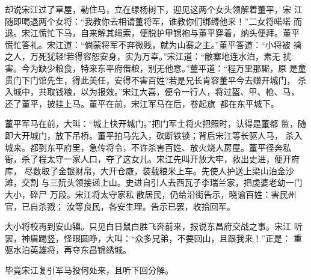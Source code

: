 却说宋江过了草屋，勒住马，立在绿杨树下，迎见这两个女头领解着董平，宋
江随即喝退两个女将：“我教你去相请董将军，谁教你们绑缚他来！”二女将喏喏
而退。宋江慌忙下马，自来解其绳索，便脱护甲锦袍与董平穿着，纳头便拜。董平
慌忙答礼。宋江道：“倘蒙将军不弃微贱，就为山寨之主。”董平答道：“小将被
擒之人，万死犹轻!若得容恕安身，实为万幸。”宋江道：“敝寨地连水泊，素无
扰害。今为缺少粮食，特来东平府借粮，别无他意。”董平道：“程万里那厮，原
是童贯门下门馆先生，得此美任，安得不害百姓?若是兄长肯容董平今去赚开城门，
杀入城中，共取钱粮，以为报效。”宋江大喜，便令一行人，将过盔、甲、枪、马，
还了董平，披挂上马。董平在前，宋江军马在后，卷起旗，都在东平城下。

董平军马在前，大叫：“城上快开城门。”把门军士将火把照时，认得是董都
监，随即大开城门，放下吊桥。董平拍马先入，砍断铁锁；背后宋江等长驱人马，
杀入城来。都到东平府里，急传将令，不许杀害百姓、放火烧人房屋。董平径奔私
衙，杀了程太守一家人口，夺了这女儿。宋江先叫开放大牢，救出史进，便开府库，
尽数取了金银财帛，大开仓廒，装载粮米上车。先使人护送上梁山泊金沙滩，交割
与三阮头领接递上山。史进自引人去西瓦子李瑞兰家，把虔婆老幼一门大小，碎尸
万段。宋江将太守家私散居民，仍给沿街告示，晓谕百姓：害民州官，已自杀戮；
汝等良民，各安生理。告示已罢，收拾回军。

大小将校再到安山镇。只见白日鼠白胜飞奔前来，报说东昌府交战之事。宋江
听罢，神眉踢竖，怪眼圆睁，大叫：“众多兄弟，不要回山，且跟我来！”正是：
重驱水泊英雄将，再夺东昌锦绣城。

毕竟宋江复引军马投何处来，且听下回分解。